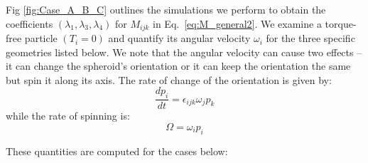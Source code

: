\documentclass{jfm}
\begin{document}
 Fig \ref{fig:Case_A_B_C} outlines the simulations we perform to obtain the coefficients $(\lambda_1,\lambda_3,\lambda_4)$ for $M_{ijk}$ in Eq.~\eqref{eq:M_general2}.  We examine a torque-free particle $(T_i  = 0)$ and quantify its angular velocity $\omega_i$ for the three specific geometries listed below.  We note that the angular velocity can cause two effects – it can change the spheroid’s orientation or it can keep the orientation the same but spin it along its axis.  The rate of change of the orientation is given by:
 \begin{equation}
 \label{eq:projector_rotation}
    \frac{d p_i}{d t} =\epsilon_{ijk}\omega_j p_k 
\end{equation} 
while the rate of spinning is:
\begin{equation}
\label{eq:projector_spinning}
    \Omega =\omega_ip_i
\end{equation}

These quantities are computed for the cases below:\\
\end{document}

